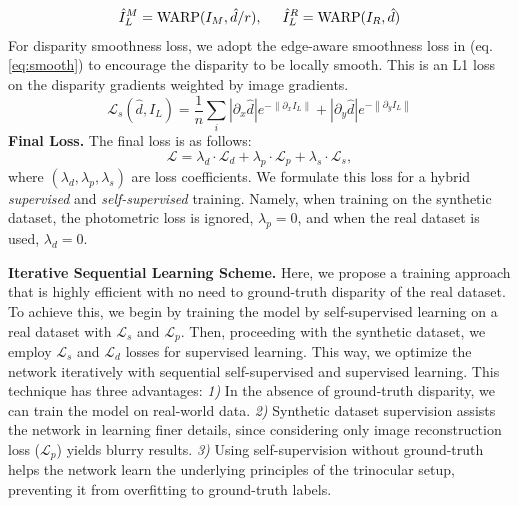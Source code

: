 \documentclass[10pt,twocolumn,letterpaper]{article}
\begin{document}
\begin{equation}
	\begin{split}
		\hat{I}_L^M = \text{WARP}(I_M,\hat{d}/r), \hspace{0.5cm} \hat{I}_L^R = \text{WARP}(I_R,\hat{d})
	\end{split}
	\label{eq:warp}
\end{equation}
For disparity smoothness loss, we adopt the edge-aware smoothness loss in \cite{heise2013pm} (eq. \ref{eq:smooth}) to encourage the disparity to be locally smooth. This is an L1 loss on the disparity gradients weighted by image gradients.
\begin{equation}
	\mathcal{L}_{s}(\hat{d}, I_L) = \frac{1}{n} \sum_{i} \left | \partial_x \hat{d}   \right | e^{-\left \| \partial_x I_{L} \right \|} + \left | \partial_y \hat{d}   \right | e^{-\left \| \partial_y I_L \right \|}
	\label{eq:smooth}
\end{equation}
\noindent\textbf{Final Loss.}
The final loss is as follows:
\begin{equation}
	\mathcal{L}=\lambda_{d} \cdot \mathcal{L}_{d}+\lambda_{p} \cdot \mathcal{L}_{p} +\lambda_{s} \cdot \mathcal{L}_{s},
\end{equation}
where $(\lambda_{d},\lambda_{p},\lambda_{s})$ are loss coefficients. We formulate this loss for a hybrid \emph{supervised} and \emph{self-supervised} training. Namely, when training on the synthetic dataset, the photometric loss is ignored, \ie $\lambda_{p}=0$, and when the real dataset is used, $\lambda_{d}=0$.

\noindent\textbf{Iterative Sequential Learning Scheme.} Here, we propose a training approach that is highly efficient with no need to ground-truth disparity of the real dataset. To achieve this, we begin by training the model by self-supervised learning on a real dataset with $\mathcal{L}_{s}$ and $\mathcal{L}_{p}$. Then, proceeding with the synthetic dataset, we employ $\mathcal{L}_{s}$ and $\mathcal{L}_{d}$ losses for supervised learning. This way, we optimize the network iteratively with sequential self-supervised and supervised learning. This technique has three advantages: \emph{1)} In the absence of ground-truth disparity, we can train the model on real-world data. \emph{2)} Synthetic dataset supervision assists the network in learning finer details, since considering only image reconstruction loss ($\mathcal{L}_{p}$) yields blurry results. \emph{3)} Using self-supervision without ground-truth helps the network learn the underlying principles of the trinocular setup, preventing it from overfitting to ground-truth labels.
\end{document}
